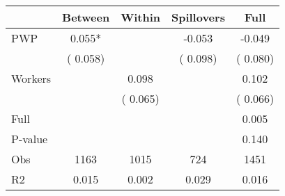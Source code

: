 
\begin{tabular}{l*{4}{c}}\hline&\multicolumn{1}{c}{Between}&\multicolumn{1}{c}{Within}&\multicolumn{1}{c}{Spillovers}&\multicolumn{1}{c}{Full}\\ \hline
 PWP           &              0.055*      &                                               &       -0.053 &        -0.049                            \\ 
                               &        (       0.058)           &                                       &       (       0.098)     &      (       0.080)                                           \\ 
 Workers       &                                               &        0.098    &                                &             0.102                            \\ 
                               &                                               & (       0.065)                  &                                        &      (       0.066)                                           \\ 
\hline                                                                                                                                                                                                                                            
 Full                  &                                               &                                               &                                        &             0.005                                     \\ 
 P-value               &                                               &                                               &                                        &             0.140                                           \\ 
 Obs                   &               1163               &       1015                       &       724                &              1451                                               \\ 
 R2                    &                      0.015              &              0.002                      &              0.029               &                     0.016                                              \\ 
\hline \end{tabular}                                                                                                                                                                                                              